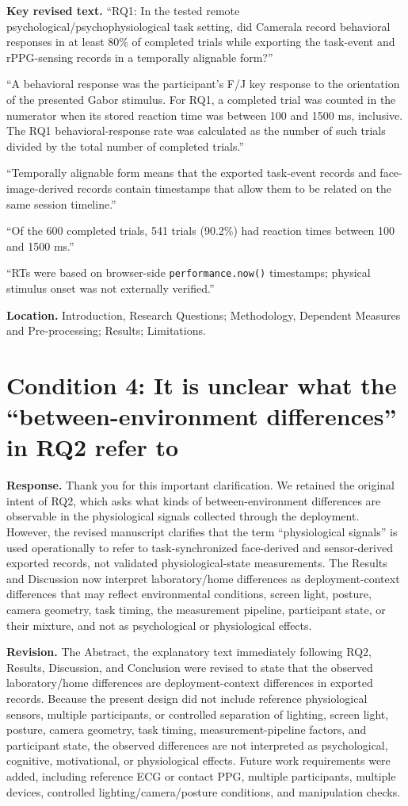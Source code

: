 \documentclass[11pt]{article}
\newcommand{\condition}[2]{\section*{Condition #1: #2}}
\begin{document}
\textbf{Key revised text.}
``RQ1: In the tested remote psychological/psychophysiological task setting, did Camerala record behavioral responses in at least 80\% of completed trials while exporting the task-event and rPPG-sensing records in a temporally alignable form?''

``A behavioral response was the participant's F/J key response to the orientation of the presented Gabor stimulus. For RQ1, a completed trial was counted in the numerator when its stored reaction time was between 100 and 1500 ms, inclusive. The RQ1 behavioral-response rate was calculated as the number of such trials divided by the total number of completed trials.''

``Temporally alignable form means that the exported task-event records and face-image-derived records contain timestamps that allow them to be related on the same session timeline.''

``Of the 600 completed trials, 541 trials (90.2\%) had reaction times between 100 and 1500 ms.''

``RTs were based on browser-side \texttt{performance.now()} timestamps; physical stimulus onset was not externally verified.''

\textbf{Location.}
Introduction, Research Questions; Methodology, Dependent Measures and Pre-processing; Results; Limitations.

\condition{4}{It is unclear what the ``between-environment differences'' in RQ2 refer to}
\textbf{Response.}
Thank you for this important clarification.
We retained the original intent of RQ2, which asks what kinds of between-environment differences are observable in the physiological signals collected through the deployment.
However, the revised manuscript clarifies that the term ``physiological signals'' is used operationally to refer to task-synchronized face-derived and sensor-derived exported records, not validated physiological-state measurements.
The Results and Discussion now interpret laboratory/home differences as deployment-context differences that may reflect environmental conditions, screen light, posture, camera geometry, task timing, the measurement pipeline, participant state, or their mixture, and not as psychological or physiological effects.

\textbf{Revision.}
The Abstract, the explanatory text immediately following RQ2, Results, Discussion, and Conclusion were revised to state that the observed laboratory/home differences are deployment-context differences in exported records.
Because the present design did not include reference physiological sensors, multiple participants, or controlled separation of lighting, screen light, posture, camera geometry, task timing, measurement-pipeline factors, and participant state, the observed differences are not interpreted as psychological, cognitive, motivational, or physiological effects.
Future work requirements were added, including reference ECG or contact PPG, multiple participants, multiple devices, controlled lighting/camera/posture conditions, and manipulation checks.
\end{document}
